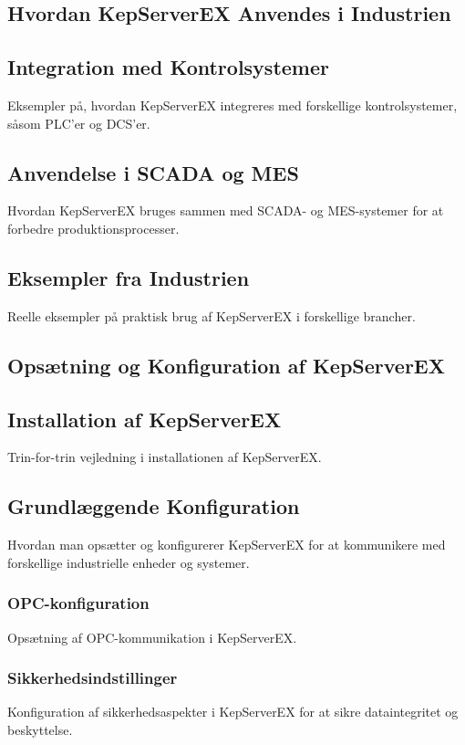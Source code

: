 \subsection{Hvordan KepServerEX Anvendes i Industrien}
\subsection{Integration med Kontrolsystemer}
Eksempler på, hvordan KepServerEX integreres med forskellige kontrolsystemer, såsom PLC'er og DCS'er.

\subsection{Anvendelse i SCADA og MES}
Hvordan KepServerEX bruges sammen med SCADA- og MES-systemer for at forbedre produktionsprocesser.

\subsection{Eksempler fra Industrien}
Reelle eksempler på praktisk brug af KepServerEX i forskellige brancher.

\subsection{Opsætning og Konfiguration af KepServerEX}
\subsection{Installation af KepServerEX}
Trin-for-trin vejledning i installationen af KepServerEX.

\subsection{Grundlæggende Konfiguration}
Hvordan man opsætter og konfigurerer KepServerEX for at kommunikere med forskellige industrielle enheder og systemer.

\subsubsection{OPC-konfiguration}
Opsætning af OPC-kommunikation i KepServerEX.

\subsubsection{Sikkerhedsindstillinger}
Konfiguration af sikkerhedsaspekter i KepServerEX for at sikre dataintegritet og beskyttelse.

